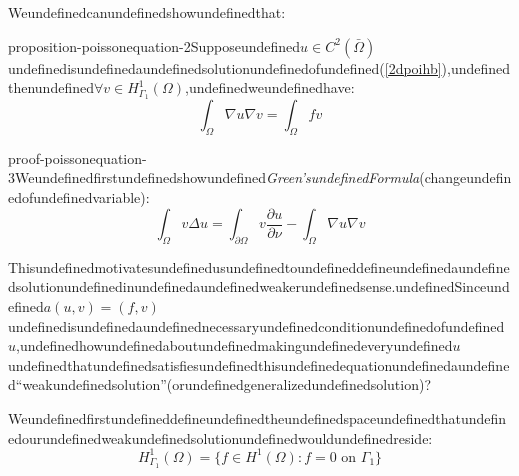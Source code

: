
Weundefinedcanundefinedshowundefinedthat:

\begin{mystthmproposition}{}{proposition-poissonequation-2}Supposeundefined$u \in C^2(\bar \Omega)$undefinedisundefinedaundefinedsolutionundefinedofundefined(\ref{2dpoihb}),undefinedthenundefined$\forall v \in H^1_{\Gamma_1}(\Omega)$,undefinedweundefinedhave:
\begin{equation}
\int_{\Omega}\nabla u \nabla v=\int_{\Omega} fv
\end{equation}

\end{mystthmproposition}
\begin{mystthmproof}{}{proof-poissonequation-3}Weundefinedfirstundefinedshowundefined\textit{Green'sundefinedFormula}(changeundefinedofundefinedvariable):
\begin{equation}
\int_{\Omega}v \Delta u = \int_{\partial \Omega} v \frac{\partial u}{\partial \nu} - \int_{\Omega} \nabla u \nabla v
\end{equation}

\end{mystthmproof}
Thisundefinedmotivatesundefinedusundefinedtoundefineddefineundefinedaundefinedsolutionundefinedinundefinedaundefinedweakerundefinedsense.undefinedSinceundefined$a(u,v)=(f,v)$undefinedisundefinedaundefinednecessaryundefinedconditionundefinedofundefined$u$,undefinedhowundefinedaboutundefinedmakingundefinedeveryundefined$u$undefinedthatundefinedsatisfiesundefinedthisundefinedequationundefinedaundefined``weakundefinedsolution''(orundefinedgeneralizedundefinedsolution)?

Weundefinedfirstundefineddefineundefinedtheundefinedspaceundefinedthatundefinedourundefinedweakundefinedsolutionundefinedwouldundefinedreside:
\begin{equation}
H^1_{\Gamma_1}(\Omega)=\{f\in H^1(\Omega): f=0 \text{ on } \Gamma_1 \}
\end{equation}